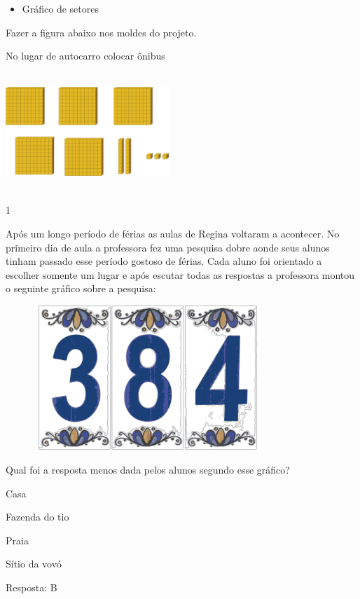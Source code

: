 \begin{escolha}
\begin{escolha}
{\begin{itemize}
\item
  Gráfico de setores
\end{itemize}

Fazer a figura abaixo nos moldes do projeto.

No lugar de autocarro colocar ônibus

\includegraphics[width=2.42308in,height=1.74971in]{media/image91.png}}


\num{1}

Após um longo período de férias as aulas de Regina voltaram a acontecer.
No primeiro dia de aula a professora fez uma pesquisa dobre aonde seus
alunos tinham passado esse período gostoso de férias. Cada aluno foi
orientado a escolher somente um lugar e após escutar todas as respostas
a professora montou o seguinte gráfico sobre a pesquisa:

\includegraphics[width=4.23077in,height=2.15071in]{media/image92.png}

Qual foi a resposta menos dada pelos alunos segundo esse gráfico?

\begin{escolha}
\item
  Casa
\item
  Fazenda do tio
\item
  Praia
\item
  Sítio da vovó
\end{escolha}

Resposta: B


\end{escolha}
\end{escolha}
